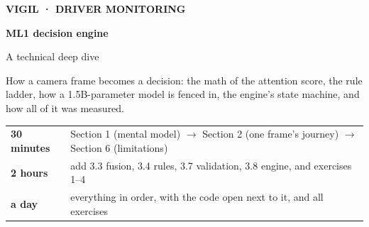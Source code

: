 \documentclass[11pt,a4paper]{article}
\begin{document}
\begin{titlepage}
\thispagestyle{empty}
\vspace*{1.2cm}
{\sffamily\color{s1}\bfseries\large VIGIL · DRIVER MONITORING\par}
\vspace{0.4cm}
{\sffamily\bfseries\fontsize{30}{36}\selectfont ML1 decision engine\par}
\vspace{0.2cm}
{\sffamily\fontsize{18}{24}\selectfont\color{ink2} A technical deep dive\par}
\vspace{1.0cm}
\vspace{1.2cm}

\begin{minipage}{0.92\textwidth}\large
How a camera frame becomes a decision: the math of the attention score, the rule ladder, how a
1.5B-parameter model is fenced in, the engine's state machine, and how all of it was measured.
\end{minipage}

\begin{keyidea}
\begin{tabularx}{\linewidth}{@{}l Y@{}}
\textbf{30 minutes} & Section 1 (mental model) $\to$ Section 2 (one frame's journey) $\to$ Section 6 (limitations) \\
\textbf{2 hours} & add 3.3 fusion, 3.4 rules, 3.7 validation, 3.8 engine, and exercises 1--4 \\
\textbf{a day} & everything in order, with the code open next to it, and all exercises \\
\end{tabularx}
\end{keyidea}


\end{titlepage}
\end{document}
